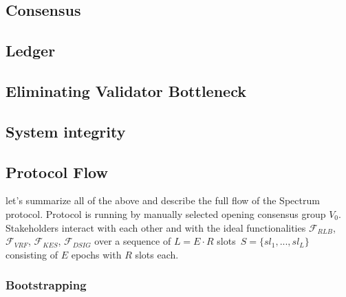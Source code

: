 \subsection{Consensus}\label{subsec:consensus}


\subsection{Ledger}\label{subsec:ledger}


\subsection{Eliminating Validator Bottleneck}\label{subsec:eliminating-validator-bottleneck}


\subsection{System integrity}\label{subsec:system-integrity}


\subsection{Protocol Flow}\label{subsec:protocol-flow}
let's summarize all of the above and describe the full flow of the Spectrum protocol.
Protocol is running by manually selected opening consensus group $V_0$.
Stakeholders interact with each other and with the ideal functionalities ${\mathcal{F}}_{RLB}$,\
${\mathcal{F}}_{VRF}$, ${\mathcal{F}}_{KES}$, ${\mathcal{F}}_{DSIG}$ over a sequence of $L = E \cdot R$ slots\
${S=\{sl_1,...,sl_L\}}$ consisting of $E$ epochs with $R$ slots each.

\subsubsection{Bootstrapping}\label{subsubsec:bootstrapping}

